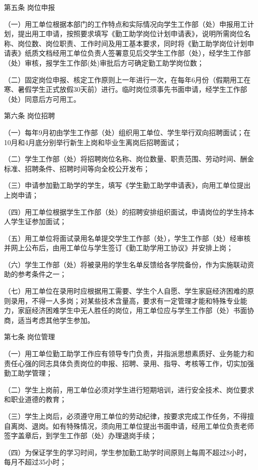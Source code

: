 \documentclass[UTF8,12pt,a4paper]{report}
\begin{document}
第五条 岗位申报

（一）用工单位根据本部门的工作特点和实际情况向学生工作部（处）申报用工计划，提出用工申请，按照要求填写《勤工助学岗位计划申请表》，说明所需岗位名称、岗位数、岗位职责、工作时间及用工基本要求，同时将《勤工助学岗位计划申请表》纸质文档经用工单位负责人签署意见后交学生工作部（处），经学生工作部（处）审核，报学生工作部(处)审批后方可确定勤工助学岗位数；

（二）固定岗位申报、核定工作原则上一年进行一次，在每年6月份（假期用工在寒、暑假学生正式放假30天前）进行。临时岗位须事先书面申请，经学生工作部（处）同意后方可用工。

第六条 岗位招聘

（一）每年9月初由学生工作部（处）组织用工单位、学生举行双向招聘面试；在10月和4月底分别举行新生上岗和毕业生离岗后招聘面试；

（二）学生工作部（处）将招聘岗位名称、岗位数量、职责范围、劳动时间、酬金标准、招聘条件、招聘时间等向全校公开发布；

（三）申请参加勤工助学的学生，填写《学生勤工助学申请表》，向用工单位提出上岗申请；

（四）用工单位根据学生工作部（处）的招聘安排组织面试，申请岗位的学生持本人学生证参加面试；

（五）用工单位将面试录用名单提交学生工作部（处），学生工作部（处）经审核并网上公布后，由用工单位与学生签订《勤工助学用工协议》并安排上岗；

（六）学生工作部（处）将被录用的学生名单反馈给各学院备份，作为实施联动资助的参考条件之一；

（七）用工单位在录用时应根据用工需要、学生个人自愿、学生家庭经济困难的原则录用，不得一人多岗；对某些技术含量高，要求有一定管理才能和特殊专业能力，家庭经济困难学生中无人胜任的岗位，用工单位应与学生工作部（处）书面协商，适当考虑其他学生参加。

第七条 岗位管理

（一）用工单位勤工助学工作应有领导专门负责，并指派思想素质好、业务能力和责任心强的同志具体负责岗位的申报、招聘、录用、指导、考核等工作，切实加强勤工助学管理；

（二）学生上岗前，用工单位必须对学生进行短期培训，进行安全技术、岗位要求和职业道德的教育；

（三）学生上岗后，必须遵守用工单位的劳动纪律，按要求完成工作任务，不得擅自离岗、退岗。如有特殊情况，须向用工单位提出书面申请，经用工单位负责老师签字盖章后，到学生工作部（处）办理退岗手续；

（四）为保证学生的学习时间，学生参加勤工助学时间原则上每周不超过8小时，每月不超过35小时；
\end{document}
